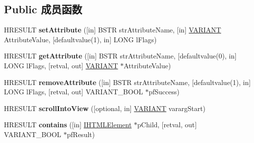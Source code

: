 \subsection*{Public 成员函数}
\begin{DoxyCompactItemize}
\item 
\mbox{\label{interface_m_s_h_t_m_l_1_1_i_h_t_m_l_element_a063ed8a8d2961d69ecf765559f2192ff}} 
H\+R\+E\+S\+U\+LT {\bfseries set\+Attribute} (\mbox{[}in\mbox{]} B\+S\+TR str\+Attribute\+Name, \mbox{[}in\mbox{]} \hyperlink{structtag_v_a_r_i_a_n_t}{V\+A\+R\+I\+A\+NT} Attribute\+Value, \mbox{[}defaultvalue(1), in\mbox{]} L\+O\+NG l\+Flags)
\item 
\mbox{\label{interface_m_s_h_t_m_l_1_1_i_h_t_m_l_element_a2d7e8c4c0163d8ae316308ff425f5cbc}} 
H\+R\+E\+S\+U\+LT {\bfseries get\+Attribute} (\mbox{[}in\mbox{]} B\+S\+TR str\+Attribute\+Name, \mbox{[}defaultvalue(0), in\mbox{]} L\+O\+NG l\+Flags, \mbox{[}retval, out\mbox{]} \hyperlink{structtag_v_a_r_i_a_n_t}{V\+A\+R\+I\+A\+NT} $\ast$Attribute\+Value)
\item 
\mbox{\label{interface_m_s_h_t_m_l_1_1_i_h_t_m_l_element_a7bec1f40877564f6cc9b84acfb51deb8}} 
H\+R\+E\+S\+U\+LT {\bfseries remove\+Attribute} (\mbox{[}in\mbox{]} B\+S\+TR str\+Attribute\+Name, \mbox{[}defaultvalue(1), in\mbox{]} L\+O\+NG l\+Flags, \mbox{[}retval, out\mbox{]} V\+A\+R\+I\+A\+N\+T\+\_\+\+B\+O\+OL $\ast$pf\+Success)
\item 
\mbox{\label{interface_m_s_h_t_m_l_1_1_i_h_t_m_l_element_ac49bd0d34a62e65ce860463709a44a03}} 
H\+R\+E\+S\+U\+LT {\bfseries scroll\+Into\+View} (\mbox{[}optional, in\mbox{]} \hyperlink{structtag_v_a_r_i_a_n_t}{V\+A\+R\+I\+A\+NT} vararg\+Start)
\item 
\mbox{\label{interface_m_s_h_t_m_l_1_1_i_h_t_m_l_element_af34bc66ed651e9efd2239e3c52e19308}} 
H\+R\+E\+S\+U\+LT {\bfseries contains} (\mbox{[}in\mbox{]} \hyperlink{interface_m_s_h_t_m_l_1_1_i_h_t_m_l_element}{I\+H\+T\+M\+L\+Element} $\ast$p\+Child, \mbox{[}retval, out\mbox{]} V\+A\+R\+I\+A\+N\+T\+\_\+\+B\+O\+OL $\ast$pf\+Result)
\item 
\mbox{\label{interface_m_s_h_t_m_l_1_1_i_h_t_m_l_element_a6d53a7b4c40c79062c8ab36666646feb}} 

\end{DoxyCompactItemize}
